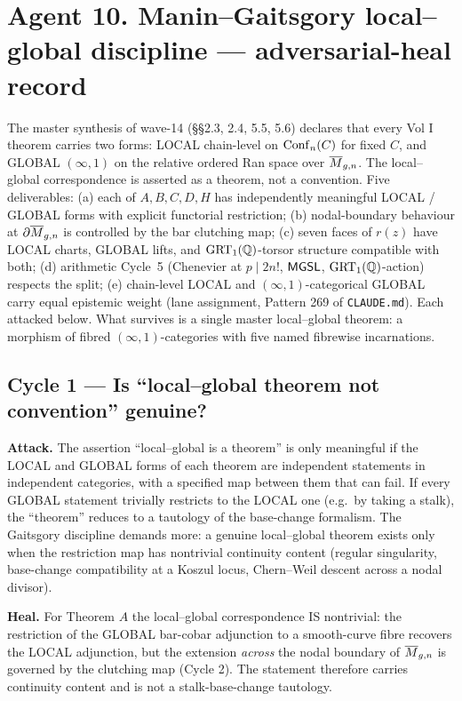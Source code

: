 \section*{Agent 10. Manin--Gaitsgory local--global discipline ---
adversarial-heal record}

The master synthesis of wave-14 (§§2.3, 2.4, 5.5, 5.6) declares that
every Vol I theorem carries two forms: LOCAL chain-level on $\mathrm{Conf}_n(C)$
for fixed $C$, and GLOBAL $(\infty,1)$ on the relative ordered Ran
space over $\overline{M}_{g,n}$. The local--global correspondence is
asserted as a theorem, not a convention. Five deliverables:
(a) each of $A, B, C, D, H$ has independently meaningful LOCAL / GLOBAL
forms with explicit functorial restriction; (b) nodal-boundary behaviour
at $\partial\overline{M}_{g,n}$ is controlled by the bar clutching map;
(c) seven faces of $r(z)$ have LOCAL charts, GLOBAL lifts, and
$\mathrm{GRT}_1(\mathbb{Q})$-torsor structure compatible with both; (d) arithmetic
Cycle~5 (Chenevier at $p \mid 2n!$, $\mathsf{MGSL}$, $\mathrm{GRT}_1(\mathbb{Q})$-action) respects
the split; (e) chain-level LOCAL and $(\infty,1)$-categorical GLOBAL
carry equal epistemic weight (lane assignment, Pattern 269 of
\texttt{CLAUDE.md}). Each attacked below. What survives is a single
master local--global theorem: a morphism of fibred $(\infty,1)$-categories
with five named fibrewise incarnations.

\subsection*{Cycle 1 --- Is ``local--global theorem not convention''
genuine?}

\textbf{Attack.} The assertion ``local--global is a theorem'' is
only meaningful if the LOCAL and GLOBAL forms of each theorem are
independent statements in independent categories, with a specified map
between them that can fail. If every GLOBAL statement trivially
restricts to the LOCAL one (e.g.\ by taking a stalk), the ``theorem''
reduces to a tautology of the base-change formalism. The Gaitsgory
discipline demands more: a genuine local--global theorem exists only
when the restriction map has nontrivial continuity content (regular
singularity, base-change compatibility at a Koszul locus, Chern--Weil
descent across a nodal divisor).

\textbf{Heal.} For Theorem $A$ the local--global correspondence IS
nontrivial: the restriction of the GLOBAL bar-cobar adjunction to
a smooth-curve fibre recovers the LOCAL adjunction, but the extension
\emph{across} the nodal boundary of $\overline{M}_{g,n}$ is governed by the
clutching map (Cycle 2). The statement therefore carries continuity
content and is not a stalk-base-change tautology.

